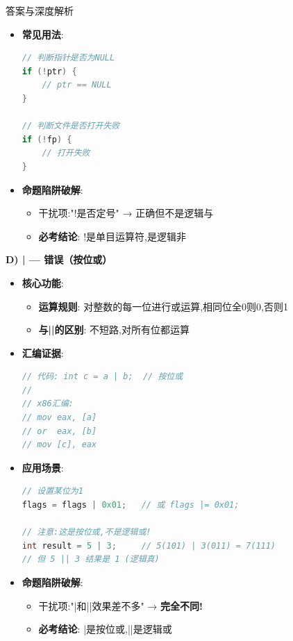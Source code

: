 \documentclass[a4paper,12pt]{article}
\begin{document}
\begin{bluebox}{答案与深度解析}
\begin{itemize}[leftmargin=*, nosep]
		\item \textbf{常见用法}:
		      \begin{lstlisting}[language=C]
// 判断指针是否为NULL
if (!ptr) {
    // ptr == NULL
}

// 判断文件是否打开失败
if (!fp) {
    // 打开失败
}
    \end{lstlisting}

		\item \textbf{命题陷阱破解}:
		      \begin{itemize}
			      \item 干扰项:"!是否定号" → 正确但不是逻辑与
			      \item \textbf{必考结论}: !是单目运算符,是逻辑非
		      \end{itemize}
	\end{itemize}

	\textbf{D) | — 错误（按位或）}
	\begin{itemize}[leftmargin=*, nosep]
		\item \textbf{核心功能}:
		      \begin{itemize}
			      \item \textbf{运算规则}: 对整数的每一位进行或运算,相同位全0则0,否则1
			      \item \textbf{与||的区别}: 不短路,对所有位都运算
		      \end{itemize}

		\item \textbf{汇编证据}:
		      \begin{lstlisting}[language=C]
// 代码: int c = a | b;  // 按位或
//
// x86汇编:
// mov eax, [a]
// or  eax, [b]
// mov [c], eax
    \end{lstlisting}

		\item \textbf{应用场景}:
		      \begin{lstlisting}[language=C]
// 设置某位为1
flags = flags | 0x01;   // 或 flags |= 0x01;

// 注意:这是按位或,不是逻辑或!
int result = 5 | 3;     // 5(101) | 3(011) = 7(111)
// 但 5 || 3 结果是 1 (逻辑真)
    \end{lstlisting}

		\item \textbf{命题陷阱破解}:
		      \begin{itemize}
			      \item 干扰项:"|和||效果差不多" → \textbf{完全不同!}
			      \item \textbf{必考结论}: |是按位或,||是逻辑或
		      \end{itemize}
	\end{itemize}


\end{bluebox}
\end{document}
